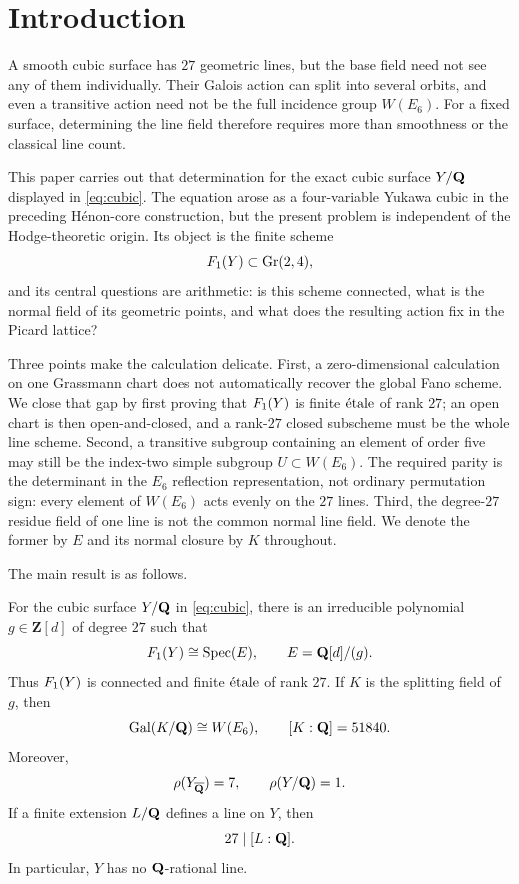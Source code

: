 \section{Introduction}
\label{sec:introduction}

A smooth cubic surface has \(27\) geometric lines, but the base field need
not see any of them individually.  Their Galois action can split into several
orbits, and even a transitive action need not be the full incidence group
\(W(E_6)\).  For a fixed surface, determining the line field therefore
requires more than smoothness or the classical line count.

This paper carries out that determination for the exact cubic surface
\(Y/\mathbf Q\) displayed in \cref{eq:cubic}.  The equation arose as a
four-variable Yukawa cubic in the preceding H\'enon-core construction, but
the present problem is independent of the Hodge-theoretic origin.  Its object
is the finite scheme
\[
  F_1(Y)\subset\operatorname{Gr}(2,4),
\]
and its central questions are arithmetic: is this scheme connected, what is
the normal field of its geometric points, and what does the resulting action
fix in the Picard lattice?

Three points make the calculation delicate.  First, a zero-dimensional
calculation on one Grassmann chart does not automatically recover the global
Fano scheme.  We close that gap by first proving that \(F_1(Y)\) is finite
\(\mathrm{\acute{e}tale}\) of rank \(27\); an open chart is then open-and-closed, and a
rank-\(27\) closed subscheme must be the whole line scheme.  Second, a
transitive subgroup containing an element of order five may still be the
index-two simple subgroup \(U\subset W(E_6)\).  The required parity is the
determinant in the \(E_6\) reflection representation, not ordinary
permutation sign: every element of \(W(E_6)\) acts evenly on the \(27\)
lines.  Third, the degree-\(27\) residue field of one line is not the common
normal line field.  We denote the former by \(E\) and its normal closure by
\(K\) throughout.

The main result is as follows.

\begin{theorem}
\label{thm:main}
For the cubic surface \(Y/\mathbf Q\) in \cref{eq:cubic}, there is an irreducible
polynomial \(g\in\mathbf Z[d]\) of degree \(27\) such that
\[
  F_1(Y)\cong\operatorname{Spec}(E),\qquad E=\mathbf Q[d]/(g).
\]
Thus \(F_1(Y)\) is connected and finite \(\mathrm{\acute{e}tale}\) of rank \(27\).
If \(K\) is the splitting field of \(g\), then
\[
  \operatorname{Gal}(K/\mathbf Q)\cong W(E_6),\qquad [K:\mathbf Q]=51840.
\]
Moreover,
\[
  \rho(Y_{\overline{\mathbf Q}})=7,\qquad \rho(Y/\mathbf Q)=1.
\]
If a finite extension \(L/\mathbf Q\) defines a line on \(Y\), then
\[
  27\mid[L:\mathbf Q].
\]
In particular, \(Y\) has no \(\mathbf Q\)-rational line.
\end{theorem}

